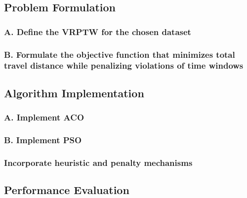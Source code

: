 \subsection{Problem Formulation}
\subsubsection{A. Define the VRPTW for the chosen dataset}
\subsubsection{B. Formulate the objective function that minimizes total travel distance while 
penalizing violations of time windows}
\subsection{Algorithm Implementation}
\subsubsection{A. Implement ACO}
\subsubsection{B. Implement PSO}
\subsubsection{Incorporate heuristic and penalty mechanisms }
\subsection{Performance Evaluation}
